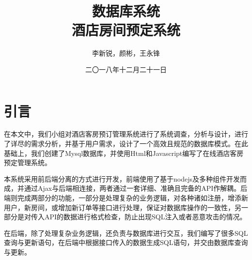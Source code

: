 \documentclass{myreport}
\begin{document}
\title{数据库系统 \\ 酒店房间预定系统}
\author{李新锐，颜彬，王永锋}                            %
\date{二〇一八年十二月二十一日}                %
\maketitle
\frontmatter
\tableofcontents
\mainmatter 


\chapter{引言}

在本文中，我们小组对酒店客房预订管理系统进行了系统调查，分析与设计，进行了详尽的需求分析，并基于用户需求，设计了一个高效且规范的数据库模式。在此基础上，我们创建了Mysql数据库，并使用Html和Javascript编写了在线酒店客房预定管理系统。

本系统采用前后端分离的方式进行开发，前端使用了基于nodejs及多种组件开发而成，并通过Ajax与后端相连接，两者通过一套详细、准确且完备的API作解耦。后端则完成两部分的功能，一部分是处理复杂的业务逻辑，对各种诸如注册，增添新用户，新房间，或增加新订单等接口进行处理，保证对数据库操作的一致性，另一部分是对传入API的数据进行格式检查，防止出现SQL注入或者恶意攻击的情况。

在后端，除了处理复杂业务逻辑，还负责与数据库进行交互，我们编写了很多SQL查询与更新语句，在后端中根据接口传入的数据生成SQL语句，并交由数据库查询与更新。
\end{document}
